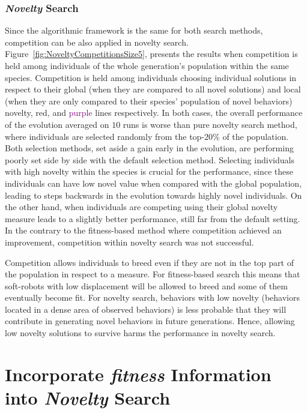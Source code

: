 \subsubsection*{\emph{Novelty} Search}

Since the algorithmic framework is the same for both search methods, competition can be also applied in novelty search. Figure~\ref{fig:NoveltyCompetitionsSize5}, presents the results when competition is held among individuals of the whole generation's population within the same species. Competition is held among individuals choosing individual solutions in respect to their global (when they are compared to all novel solutions) and local (when they are only compared to their species' population of novel behaviors) novelty, \textcolor{BrickRed}{red}, and \textcolor{Purple}{purple} lines respectively. In both cases, the overall performance of the evolution averaged on $10$ runs is worse than pure novelty search method, where individuals are selected randomly from the top-$20\%$ of the population. Both selection methods, set aside a gain early in the evolution, are performing poorly set side by side with the default selection method. Selecting individuals with high novelty within the species is crucial for the performance, since these individuals can have low novel value when compared with the global population, leading to steps backwards in the evolution towards highly novel individuals. On the other hand, when individuals are competing using their global novelty measure leads to a slightly better performance, still far from the default setting. In the contrary to the fitness-based method where competition achieved an improvement, competition within novelty search was not successful. 

Competition allows individuals to breed even if they are not in the top part of the population in respect to a measure. For fitness-based search this means that soft-robots with low displacement will be allowed to breed and some of them eventually become fit. For novelty search, behaviors with low novelty (behaviors located in a dense area of observed behaviors) is less probable that they will contribute in generating novel behaviors in future generations. Hence, allowing low novelty solutions to survive harms the performance in novelty search.


\section{Incorporate \emph{fitness} Information into \emph{Novelty} Search}


